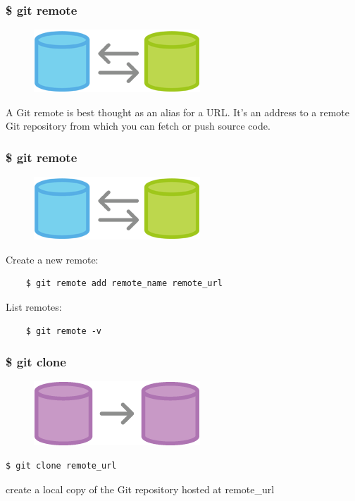 \documentclass{beamer}
\begin{document}
\begin{frame}
    \frametitle{\$ git remote}
    \begin{figure}[h!]
        \begin{center}
            \includegraphics[scale=0.7]{remote.png}
        \end{center}
    \end{figure}
    A Git remote is best thought as an alias for a URL.
    It's an address to a remote Git repository from
    which you can fetch or push source code.
\end{frame}

\begin{frame}[fragile]
    \frametitle{\$ git remote}
    \begin{figure}[h!]
        \begin{center}
            \includegraphics[scale=0.7]{remote.png}
        \end{center}
    \end{figure}
    Create a new remote:
    \begin{verbatim}
    $ git remote add remote_name remote_url
    \end{verbatim}
    List remotes:
    \begin{verbatim}
    $ git remote -v
    \end{verbatim}
\end{frame}

\begin{frame}[fragile]
    \frametitle{\$ git clone}
    \begin{figure}[h!]
        \begin{center}
            \includegraphics[scale=0.7]{clone.png}
        \end{center}
    \end{figure}
    \begin{verbatim}
$ git clone remote_url
    \end{verbatim}
    create a local copy of the Git repository hosted at remote\_url
\end{frame}
\end{document}
